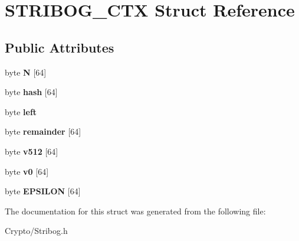 \hypertarget{struct_s_t_r_i_b_o_g___c_t_x}{}\section{S\+T\+R\+I\+B\+O\+G\+\_\+\+C\+TX Struct Reference}
\label{struct_s_t_r_i_b_o_g___c_t_x}
\subsection*{Public Attributes}
\begin{DoxyCompactItemize}
\item 
\mbox{\label{struct_s_t_r_i_b_o_g___c_t_x_aff48dcf602c540c7e005664d05834ea1}} 
byte {\bfseries N} \mbox{[}64\mbox{]}
\item 
\mbox{\label{struct_s_t_r_i_b_o_g___c_t_x_a99872eb6a84ccc36dba66f43b87f3314}} 
byte {\bfseries hash} \mbox{[}64\mbox{]}
\item 
\mbox{\label{struct_s_t_r_i_b_o_g___c_t_x_ac9c286df4892912c8de0040f8bfb2053}} 
byte {\bfseries left}
\item 
\mbox{\label{struct_s_t_r_i_b_o_g___c_t_x_afe562a68869cdc94cd167c889bd80e12}} 
byte {\bfseries remainder} \mbox{[}64\mbox{]}
\item 
\mbox{\label{struct_s_t_r_i_b_o_g___c_t_x_a5da88a43f4d034ec026e6c5c08aa0c72}} 
byte {\bfseries v512} \mbox{[}64\mbox{]}
\item 
\mbox{\label{struct_s_t_r_i_b_o_g___c_t_x_ae1e9417c00ae37b6becede1a4d5cf61b}} 
byte {\bfseries v0} \mbox{[}64\mbox{]}
\item 
\mbox{\label{struct_s_t_r_i_b_o_g___c_t_x_af26ff52b3025a219bd8f4b2c671f64d8}} 
byte {\bfseries E\+P\+S\+I\+L\+ON} \mbox{[}64\mbox{]}
\end{DoxyCompactItemize}


The documentation for this struct was generated from the following file\+:\begin{DoxyCompactItemize}
\item 
Crypto/Stribog.\+h\end{DoxyCompactItemize}
